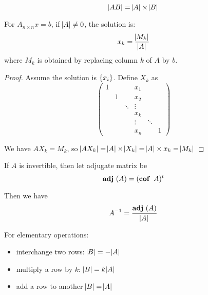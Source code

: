 \begin{theorem}
    \begin{equation}
        \abs{AB} = \abs{A} \times \abs{B}
    \end{equation}    
\end{theorem}


\begin{theorem}
    For $A_{n \times n}x=b$, if $\abs{A} \neq 0$, the solution is:
    \begin{equation}
        x_k = \frac{\abs{M_k}}{\abs{A}}
    \end{equation}
    where $M_k$ is obtained by replacing column $k$ of $A$ by $b$.
\end{theorem}
\begin{proof}
    Assume the solution is $\set{x_i}$. Define $X_k$ as 
    \begin{equation*}
        \begin{pmatrix}
        1 &   &   & x_1 &  \\
          & 1 &   & x_2 &  \\
          &   & \ddots & \vdots \\
          &   &        &  x_k & \\
          &&& \vdots & \ddots \\
          &&& x_n & & 1          
        \end{pmatrix}
    \end{equation*}
    
    We have $A X_k = M_k$, so $\abs{A X_k} = \abs{A} \times \abs{X_k} = \abs{A} \times x_k = \abs{M_k}$
\end{proof}

\begin{theorem}
    If $A$ is invertible, then let adjugate matrix be
    \begin{equation}
        \adjugate{A} = (\cofactor{A})^t
    \end{equation}
    
    Then we have
    \begin{equation}
        \inverse{A} = \frac{\adjugate{A}}{\determinate{A}}
    \end{equation}    
\end{theorem}


\begin{theorem}
  For elementary operations:
\begin{itemize}
    \item interchange two rows: $\abs{B} = - \abs{A}$ 
    \item multiply a row by $k$: $\abs{B} = k \abs{A}$
    \item add a row to another $\abs{B} = \abs{A}$
\end{itemize}  
\end{theorem}


